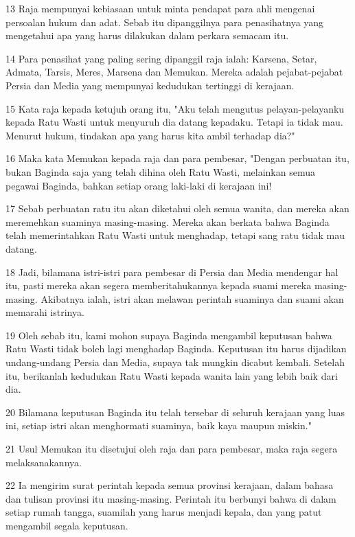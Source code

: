 \par 13 Raja mempunyai kebiasaan untuk minta pendapat para ahli mengenai persoalan hukum dan adat. Sebab itu dipanggilnya para penasihatnya yang mengetahui apa yang harus dilakukan dalam perkara semacam itu.
\par 14 Para penasihat yang paling sering dipanggil raja ialah: Karsena, Setar, Admata, Tarsis, Meres, Marsena dan Memukan. Mereka adalah pejabat-pejabat Persia dan Media yang mempunyai kedudukan tertinggi di kerajaan.
\par 15 Kata raja kepada ketujuh orang itu, "Aku telah mengutus pelayan-pelayanku kepada Ratu Wasti untuk menyuruh dia datang kepadaku. Tetapi ia tidak mau. Menurut hukum, tindakan apa yang harus kita ambil terhadap dia?"
\par 16 Maka kata Memukan kepada raja dan para pembesar, "Dengan perbuatan itu, bukan Baginda saja yang telah dihina oleh Ratu Wasti, melainkan semua pegawai Baginda, bahkan setiap orang laki-laki di kerajaan ini!
\par 17 Sebab perbuatan ratu itu akan diketahui oleh semua wanita, dan mereka akan meremehkan suaminya masing-masing. Mereka akan berkata bahwa Baginda telah memerintahkan Ratu Wasti untuk menghadap, tetapi sang ratu tidak mau datang.
\par 18 Jadi, bilamana istri-istri para pembesar di Persia dan Media mendengar hal itu, pasti mereka akan segera memberitahukannya kepada suami mereka masing-masing. Akibatnya ialah, istri akan melawan perintah suaminya dan suami akan memarahi istrinya.
\par 19 Oleh sebab itu, kami mohon supaya Baginda mengambil keputusan bahwa Ratu Wasti tidak boleh lagi menghadap Baginda. Keputusan itu harus dijadikan undang-undang Persia dan Media, supaya tak mungkin dicabut kembali. Setelah itu, berikanlah kedudukan Ratu Wasti kepada wanita lain yang lebih baik dari dia.
\par 20 Bilamana keputusan Baginda itu telah tersebar di seluruh kerajaan yang luas ini, setiap istri akan menghormati suaminya, baik kaya maupun miskin."
\par 21 Usul Memukan itu disetujui oleh raja dan para pembesar, maka raja segera melaksanakannya.
\par 22 Ia mengirim surat perintah kepada semua provinsi kerajaan, dalam bahasa dan tulisan provinsi itu masing-masing. Perintah itu berbunyi bahwa di dalam setiap rumah tangga, suamilah yang harus menjadi kepala, dan yang patut mengambil segala keputusan.

